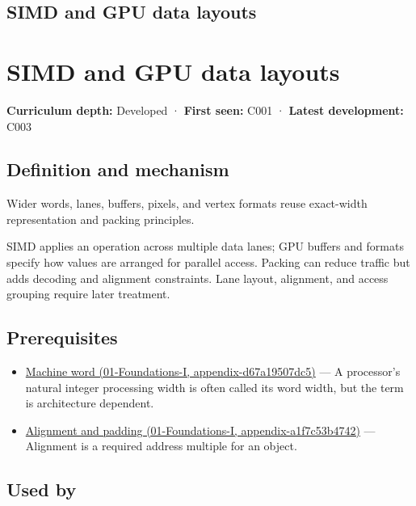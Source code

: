 \hypertarget{appendix-3c7b1a56de01}{}
\section*{SIMD and GPU data layouts}
\chapter{SIMD and GPU data layouts}\label{appendix-3c7b1a56de01-simd-and-gpu-data-layouts}

\textbf{Curriculum depth:} Developed · \textbf{First seen:} C001 · \textbf{Latest development:} C003

\section{Definition and mechanism}\label{appendix-3c7b1a56de01-definition-and-mechanism}

Wider words, lanes, buffers, pixels, and vertex formats reuse exact-width representation and packing principles.

SIMD applies an operation across multiple data lanes; GPU buffers and formats specify how values are arranged for parallel access. Packing can reduce traffic but adds decoding and alignment constraints. Lane layout, alignment, and access grouping require later treatment.

\section{Prerequisites}\label{appendix-3c7b1a56de01-prerequisites}

\begin{itemize}
\tightlist
\item
  \href{../01-Foundations-I/main.pdf\#nameddest=appendix-d67a19507dc5}{Machine word (01-Foundations-I, appendix-d67a19507dc5)} --- A processor's natural integer processing width is often called its word width, but the term is architecture dependent.
\item
  \href{../01-Foundations-I/main.pdf\#nameddest=appendix-a1f7c53b4742}{Alignment and padding (01-Foundations-I, appendix-a1f7c53b4742)} --- Alignment is a required address multiple for an object.
\end{itemize}

\section{Used by}\label{appendix-3c7b1a56de01-used-by}

